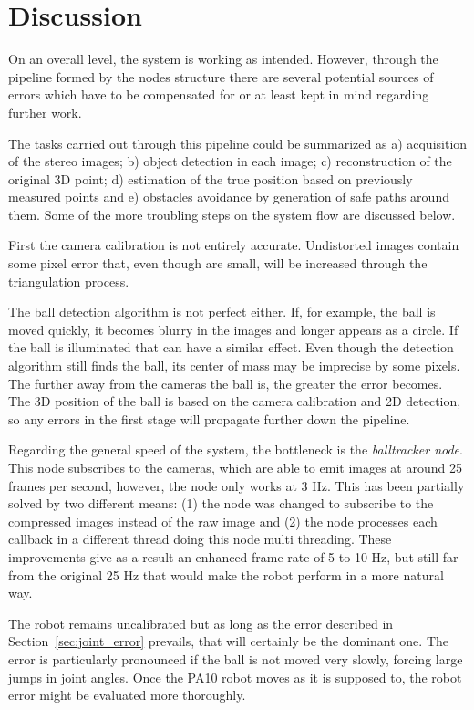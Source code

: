 \chapter{Discussion}
\label{chap:discussion}
On an overall level, the system is working as intended. 
However, through the pipeline formed by the nodes structure there are several potential sources of errors which have to be compensated for or at least kept in mind regarding further work.

The tasks carried out through this pipeline could be summarized as a) acquisition of the stereo images; b) object detection in each image; c) reconstruction of the original 3D point; d) estimation of the true position based on previously measured points and e) obstacles avoidance by generation of safe paths around them.
Some of the more troubling steps on the system flow are discussed below.

First the camera calibration is not entirely accurate.
Undistorted images contain some pixel error that, even though are small, will be increased through the triangulation process.

The ball detection algorithm is not perfect either.
If, for example, the ball is moved quickly, it becomes blurry in the images and longer appears as a circle.
If the ball is illuminated that can have a similar effect.
Even though the detection algorithm still finds the ball, its center of mass may be imprecise by some pixels.
The further away from the cameras the ball is, the greater the error becomes.
The 3D position of the ball is based on the camera calibration and 2D detection, so any errors in the first stage will propagate further down the pipeline.

Regarding the general speed of the system, the bottleneck is the \emph{balltracker node}. 
This node subscribes to the cameras, which are able to emit images at around 25 frames per second, however, the node only works at 3 Hz. 
This has been partially solved by two different means: (1) the node was changed to subscribe to the compressed images instead of the raw image and (2) the node processes each callback in a different thread doing this node multi threading. 
These improvements give as a result an enhanced frame rate of 5 to 10 Hz, but still far from the original 25 Hz that would make the robot perform in a more natural way.
 
The robot remains uncalibrated but as long as the error described in Section~\ref{sec:joint_error} prevails, that will certainly be the dominant one. The error is particularly pronounced if the ball is not moved very slowly, forcing large jumps in joint angles. Once the PA10 robot moves as it is supposed to, the robot error might be evaluated more thoroughly.


